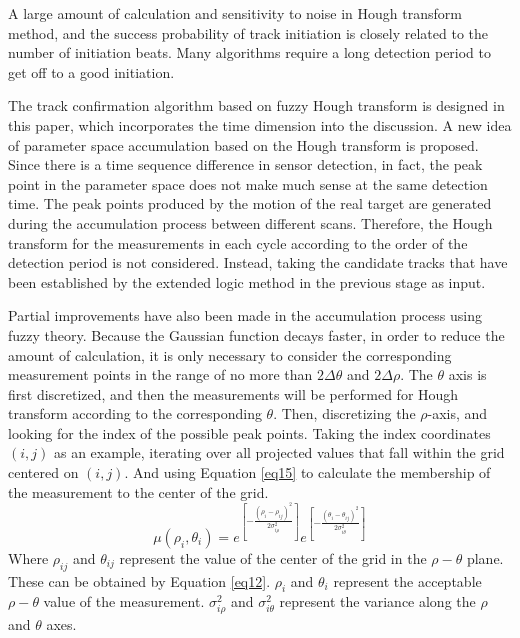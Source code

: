 \documentclass[default,iicol]{sn-jnl}%
\theoremstyle{thmstyleone}%
\theoremstyle{thmstyletwo}%
\theoremstyle{thmstylethree}%
\begin{document}
A large amount of calculation and sensitivity to noise in Hough transform method, and the success probability of track initiation is closely related to the number of initiation beats. Many algorithms require a long detection period to get off to a good initiation.

The track confirmation algorithm based on fuzzy Hough transform is designed in this paper, which incorporates the time dimension into the discussion. A new idea of parameter space accumulation based on the Hough transform is proposed. Since there is a time sequence difference in sensor detection, in fact, the peak point in the parameter space does not make much sense at the same detection time. The peak points produced by the motion of the real target are generated during the accumulation process between different scans. Therefore, the Hough transform for the measurements in each cycle according to the order of the detection period is not considered. Instead, taking the candidate tracks that have been established by the extended logic method in the previous stage as input.

Partial improvements have also been made in the accumulation process using fuzzy theory. Because the Gaussian function decays faster, in order to reduce the amount of calculation, it is only necessary to consider the corresponding measurement points in the range of no more than $2\varDelta \theta$ and $2\varDelta \rho$. The $\theta$ axis is first discretized, and then the measurements will be performed for Hough transform according to the corresponding $\theta$. Then, discretizing the $\rho$-axis, and looking for the index of the possible peak points. Taking the index coordinates $(i,j)$ as an example, iterating over all projected values that fall within the grid centered on $(i,j)$. And using Equation \ref{eq15} to calculate the membership of the measurement to the center of the grid.
\begin{equation}\label{eq15}
    \mu ( \rho _ { i  }, \theta _ { i } ) = e ^ { [ -  \frac { ( \rho_{ i }- \rho_{ i j }) ^ { 2 } } { 2 \sigma _ { i \rho }^ { 2 } }  ]}  e ^ { [ -  \frac { ( \theta_{ i }- \theta_{ i j }) ^ { 2 } } { 2 \sigma _ { i \theta }^ { 2 } }  ]}
\end{equation}
Where $\rho_{ i j }$ and $\theta_{ i j }$ represent the value of the center of the grid in the $\rho-\theta$ plane. These can be obtained by Equation \ref{eq12}. $\rho_{ i }$ and $\theta_{ i }$ represent the acceptable $\rho-\theta$ value of the measurement. $\sigma _ { i \rho }^ { 2 }$ and $\sigma _ { i \theta }^ { 2 } $ represent the variance along the $\rho$ and $\theta$ axes.
\end{document}
